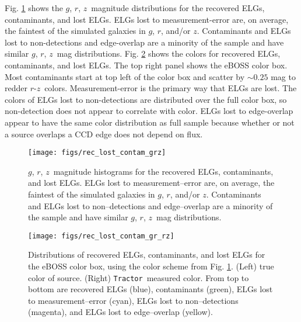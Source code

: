 \documentclass[a4paper,fleqn,usenatbib]{mnras}
\newcommand{\gb}{$g$}
\newcommand{\rband}{$r$}
\newcommand{\zb}{$z$}
\newcommand{\tractor}{{\tt Tractor}}
\begin{document}
Fig. \ref{fig:rec-lost-contam-mag} shows the \gb, \rband, \zb\, magnitude distributions for the recovered ELGs, contaminants, and lost ELGs. ELGs lost to measurement-error are, on average, the faintest of the simulated galaxies in \gb, \rband, and/or \zb. Contaminants and ELGs lost to non-detections and edge-overlap are a minority of the sample and have similar \gb, \rband, \zb\, mag distributions. Fig. \ref{fig:rec-lost-contam-color} shows the colors for recovered ELGs, contaminants, and lost ELGs. The top right panel shows the eBOSS color box. Most contaminants start at top left of the color box and scatter by $\sim 0.25$ mag to redder \rband-\zb\, colors. Measurement-error is the primary way that ELGs are lost. The colors of ELGs lost to non-detections are distributed over the full color box, so non-detection does not appear to correlate with color. ELGs lost to edge-overlap appear to have the same color distribution as full sample because whether or not a source overlaps a CCD edge does not depend on flux. 

\begin{figure}
\begin{center}
 \texttt{[image: figs/rec\_lost\_contam\_grz]}
\end{center}
 \caption[Magnitude distributions of recovered ELGs, contaminants, and lost ELGs]{\gb, \rband, \zb\, magnitude histograms for the recovered ELGs, contaminants, and lost ELGs. ELGs lost to measurement--error are, on average, the faintest of the simulated galaxies in \gb, \rband, and/or \zb. Contaminants and ELGs lost to non--detections and edge--overlap are a minority of the sample and have similar \gb, \rband, \zb\, mag distributions. 
 }
 \label{fig:rec-lost-contam-mag}
\end{figure}

\begin{figure}
\begin{center}
 \texttt{[image: figs/rec\_lost\_contam\_gr\_rz]}
\end{center}
 \caption[Colors of recovered ELGs, contaminants, and lost ELGs]{Distributions of recovered ELGs, contaminants, and lost ELGs for the eBOSS color box, using the color scheme from Fig. \ref{fig:rec-lost-contam-mag}. (Left) true color of source. (Right) \tractor\, measured color. From top to bottom are recovered ELGs (blue), contaminants (green), ELGs lost to measurement--error (cyan), ELGs lost to non--detections (magenta), and ELGs lost to edge--overlap (yellow).}
 \label{fig:rec-lost-contam-color}
\end{figure}
\end{document}
